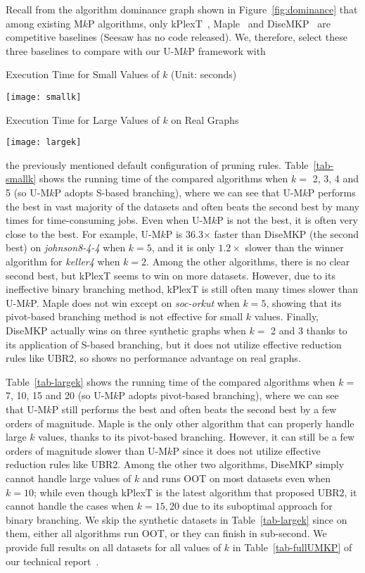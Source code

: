 \documentclass[sigconf, nonacm]{acmart}
\begin{document}
Recall from the algorithm dominance graph shown in Figure~\ref{fig:dominance} that among existing M$k$P algorithms, only kPlexT~\cite{kPlexT}, Maple~\cite{Maple} and DiseMKP~\cite{DiseMKP} are competitive baselines (Seesaw has no code released). We, therefore, select these three baselines to compare with our U-M$k$P framework with
\begin{wraptable}[27]{r}[\dimexpr\columnwidth+\columnsep\relax]{11.9cm}
    \centering
    \vspace{-4.5mm}
    \caption{Execution Time for Small Values of $k$ (Unit: seconds)}\label{tab-smallk}
    \vspace{-3.5mm}
    \texttt{[image: smallk]}
    \caption{Execution Time for Large Values of $k$ on Real Graphs}\label{tab-largek}
    \vspace{-3.5mm}
    \texttt{[image: largek]}
\end{wraptable}
the previously mentioned default configuration of pruning rules. Table~\ref{tab-smallk} shows the running time of the compared algorithms when $k=$ 2, 3, 4 and 5 (so U-M$k$P adopts S-based branching), where we can see that U-M$k$P performs the best in vast majority of the datasets and often beats the second best by many times for time-consuming jobs. Even when U-M$k$P is not the best, it is often very close to the best. For example, U-M$k$P is 36.3$\times$ faster than DiseMKP (the second best) on \textit{johnson8-4-4} when $k=5$, and it is only $1.2\times$ slower than the winner algorithm for \textit{keller4} when $k=2$. Among the other algorithms, there is no clear second best, but kPlexT seems to win on more datasets. However, due to its ineffective binary branching method, kPlexT is still often many times slower than U-M$k$P. Maple does not win except on {\em soc-orkut} when $k=5$, showing that its pivot-based branching method is not effective for small $k$ values. Finally, DiseMKP actually wins on three synthetic graphs when $k=$ 2 and 3 thanks to its application of S-based branching, but it does not utilize effective reduction rules like UBR2, so shows no performance advantage on real graphs. 

Table~\ref{tab-largek} shows the running time of the compared algorithms when $k=$ 7, 10, 15 and 20 (so U-M$k$P adopts pivot-based branching), where we can see that U-M$k$P still performs the best and often beats the second best by a few orders of magnitude. Maple is the only other algorithm that can properly handle large $k$ values, thanks to its pivot-based branching. However, it can still be a few orders of magnitude slower than U-M$k$P since it does not utilize effective reduction rules like UBR2. Among the other two algorithms, DiseMKP simply cannot handle large values of $k$ and runs OOT on most datasets even when $k=10$; while even though kPlexT is the latest algorithm that proposed UBR2, it cannot handle the cases when $k=15, 20$ due to its suboptimal approach for binary branching. We skip the synthetic datasets in Table~\ref{tab-largek} since on them, either all algorithms run OOT, or they can finish in sub-second. We provide full results on all datasets for all values of $k$ in Table~\ref{tab-fullUMKP} of our technical report~\cite{tech_report}.
\end{document}
